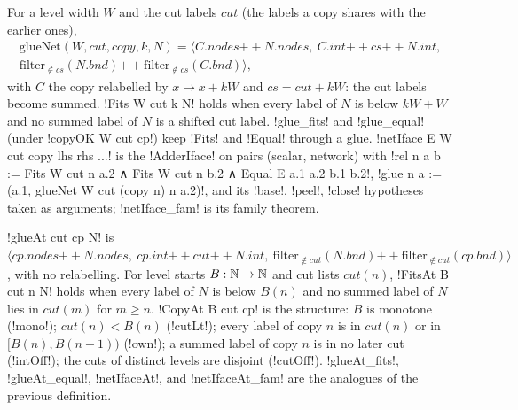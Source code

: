 {\begin{definition}\label{def:boxes-glueNet}
For a level width $W$ and the cut labels $\mathit{cut}$ (the labels a copy shares with the earlier ones),
\begin{multline*}
\mathrm{glueNet}(W,\mathit{cut},\mathit{copy},k,N)=\bigl\langle C.\mathit{nodes}\mathbin{+\!\!+}N.\mathit{nodes},\ C.\mathit{int}\mathbin{+\!\!+}\mathit{cs}\mathbin{+\!\!+}N.\mathit{int},\\
\mathrm{filter}_{\notin\mathit{cs}}(N.\mathit{bnd})\mathbin{+\!\!+}\mathrm{filter}_{\notin\mathit{cs}}(C.\mathit{bnd})\bigr\rangle,
\end{multline*}
with $C$ the copy relabelled by $x\mapsto x+kW$ and $\mathit{cs}=\mathit{cut}+kW$: the cut labels become summed. \lbx!Fits W cut k N! holds when every label of $N$ is below $kW+W$ and no summed label of $N$ is a shifted cut label. \lbx!glue_fits! and \lbx!glue_equal! (under \lbx!copyOK W cut cp!) keep \lbx!Fits! and \lbx!Equal! through a glue. \lbx!netIface E W cut copy lhs rhs ...! is the \lbx!AdderIface! on pairs (scalar, network) with \lbx!rel n a b := Fits W cut n a.2 ∧ Fits W cut n b.2 ∧ Equal E a.1 a.2 b.1 b.2!, \lbx!glue n a := (a.1, glueNet W cut (copy n) n a.2)!, and its \lbx!base!, \lbx!peel!, \lbx!close! hypotheses taken as arguments; \lbx!netIface_fam! is its family theorem.
\end{definition}

\begin{definition}\label{def:boxes-glueAt}
\lbx!glueAt cut cp N! is $\langle \mathit{cp}.\mathit{nodes}\mathbin{+\!\!+}N.\mathit{nodes},\ \mathit{cp}.\mathit{int}\mathbin{+\!\!+}\mathit{cut}\mathbin{+\!\!+}N.\mathit{int},\ \mathrm{filter}_{\notin\mathit{cut}}(N.\mathit{bnd})\mathbin{+\!\!+}\mathrm{filter}_{\notin\mathit{cut}}(\mathit{cp}.\mathit{bnd})\rangle$, with no relabelling. For level starts $B:\mathbb{N}\to\mathbb{N}$ and cut lists $\mathit{cut}(n)$, \lbx!FitsAt B cut n N! holds when every label of $N$ is below $B(n)$ and no summed label of $N$ lies in $\mathit{cut}(m)$ for $m\ge n$. \lbx!CopyAt B cut cp! is the structure: $B$ is monotone (\lbx!mono!); $\mathit{cut}(n)<B(n)$ (\lbx!cutLt!); every label of copy $n$ is in $\mathit{cut}(n)$ or in $[B(n),B(n+1))$ (\lbx!own!); a summed label of copy $n$ is in no later cut (\lbx!intOff!); the cuts of distinct levels are disjoint (\lbx!cutOff!). \lbx!glueAt_fits!, \lbx!glueAt_equal!, \lbx!netIfaceAt!, and \lbx!netIfaceAt_fam! are the analogues of the previous definition.
\end{definition}

}
